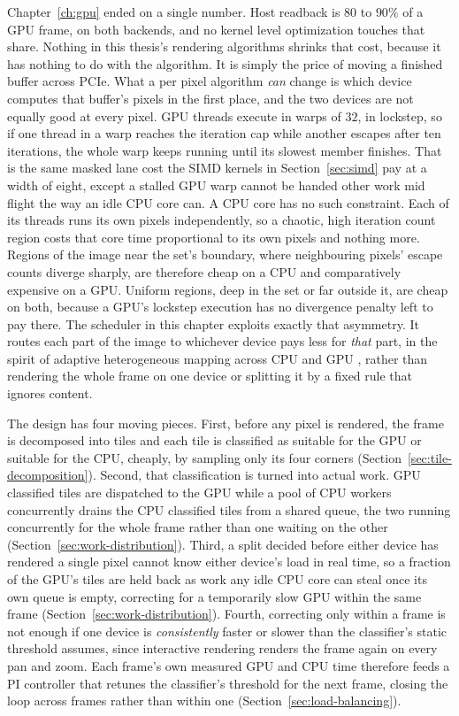 \documentclass{ftndiplomski}
\begin{document}
Chapter~\ref{ch:gpu} ended on a single number. Host readback is $80$ to $90\%$
of a GPU frame, on both backends, and no kernel level optimization touches that share. Nothing
in this thesis's rendering algorithms shrinks that
cost, because it has nothing to do with the algorithm. It is simply the price of moving a finished
buffer across PCIe. What a per pixel algorithm \emph{can} change is which device computes that
buffer's pixels in the first place, and the two devices are not equally good at every pixel.
GPU threads execute in warps of $32$, in lockstep, so if one thread in a warp reaches the
iteration cap while another escapes after ten iterations, the whole warp keeps running until
its slowest member finishes. That is the same masked lane cost the SIMD kernels in
Section~\ref{sec:simd} pay at a width of eight, except a stalled GPU warp cannot be handed other
work mid flight the way an idle CPU core can. A CPU core has no such constraint. Each of its
threads runs its own pixels independently, so a chaotic, high iteration count region costs that
core time proportional to its own pixels and nothing more. Regions of the image near the set's
boundary, where neighbouring pixels' escape counts diverge sharply, are therefore cheap on a CPU
and comparatively expensive on a GPU. Uniform regions, deep in the set or far outside it, are
cheap on both, because a GPU's lockstep execution has no divergence penalty left to pay there. The
scheduler in this chapter exploits exactly that asymmetry. It routes each part of the image to
whichever device pays less for \emph{that} part, in the spirit of adaptive heterogeneous mapping
across CPU and GPU \cite{luk2009qilin}, rather than rendering the whole frame on one device or
splitting it by a fixed rule that ignores content.

The design has four moving pieces. First, before any pixel is rendered, the frame is decomposed into tiles and each tile is classified as
suitable for the GPU or suitable for the CPU, cheaply, by sampling only its four corners
(Section~\ref{sec:tile-decomposition}). Second, that classification is turned into actual work.
GPU classified tiles are dispatched to the GPU while a pool of CPU workers concurrently drains
the CPU classified tiles from a shared queue, the two running concurrently for the whole frame
rather than one waiting on the other (Section~\ref{sec:work-distribution}). Third, a
split decided
before either device has rendered a single pixel cannot know either device's load in real time, so a
fraction of the GPU's tiles are held back as work any idle CPU core can steal once its own queue
is empty, correcting for a temporarily slow GPU within the same frame
(Section~\ref{sec:work-distribution}). Fourth, correcting only within a frame is not enough if
one device is \emph{consistently} faster or slower than the classifier's static threshold
assumes, since interactive rendering renders the frame again on every pan and zoom. Each frame's own measured
GPU and CPU time therefore feeds a PI controller that retunes the classifier's threshold for the next frame,
closing the loop across frames rather than within one (Section~\ref{sec:load-balancing}).
\end{document}

